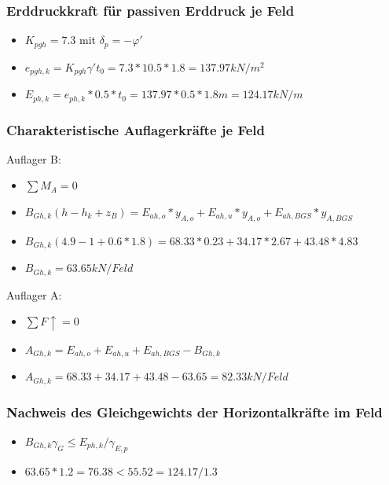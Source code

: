 \documentclass[11pt,fleqn,a4paper,halfparskip]{article}
\begin{document}
\subsubsection*{Erddruckkraft für passiven Erddruck je Feld}
\begin{itemize}
\item[] $K_{pgh} = 7.3$ mit $\delta_p = -\varphi'$
\item[] $e_{pgh,k} = K_{pgh} \gamma' t_0 = 7.3*10.5*1.8 = 137.97kN/m^2$
\item[] $E_{ph,k} = e_{ph,k}*0.5*t_0 = 137.97*0.5*1.8m = 124.17kN/m$
\end{itemize}
\subsubsection*{Charakteristische Auflagerkräfte je Feld}
Auflager B:
\begin{itemize}
\item[] $\sum M_A = 0$
\item[] $B_{Gh,k} (h - h_k + z_B) = E_{ah,o}*y_{A,o} + E_{ah,u}*y_{A,o} + E_{ah,BGS}*y_{A,BGS}$
\item[] $B_{Gh,k}(4.9-1+0.6*1.8) = 68.33*0.23 + 34.17 * 2.67 + 43.48*4.83$
\item[] $B_{Gh,k} =  63.65kN/Feld$
\end{itemize}
Auflager A:
\begin{itemize}
\item[] $\sum F \uparrow = 0$
\item[] $A_{Gh,k} = E_{ah,o} + E_{ah,u} + E_{ah,BGS} - B_{Gh,k}$
\item[] $A_{Gh,k} = 68.33 + 34.17 + 43.48 - 63.65 = 82.33kN/Feld$
\end{itemize}
\subsubsection*{Nachweis des Gleichgewichts der Horizontalkräfte im Feld}
\begin{itemize}
\item[] $B_{Gh,k}\gamma_G \le E_{ph,k}/\gamma_{E,p}$
\item[] $63.65*1.2 = 76.38 < 55.52 = 124.17/1.3$
\end{itemize}
\end{document}
